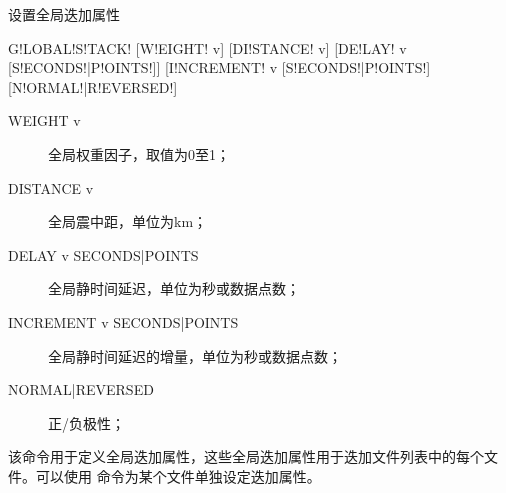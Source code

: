 \label{sss:globalstack}

设置全局迭加属性

\begin{SACSTX}
G!LOBAL!S!TACK! [W!EIGHT! v] [DI!STANCE! v] [DE!LAY! v [S!ECONDS!|P!OINTS!]]
    [I!NCREMENT! v [S!ECONDS!|P!OINTS!] [N!ORMAL!|R!EVERSED!]
\end{SACSTX}

\begin{description}
\item [WEIGHT v] 全局权重因子，取值为0至1；
\item [DISTANCE v] 全局震中距，单位为km；
\item [DELAY v SECONDS|POINTS] 全局静时间延迟，单位为秒或数据点数；
\item [INCREMENT v SECONDS|POINTS] 全局静时间延迟的增量，单位为秒或数据点数；
\item [NORMAL|REVERSED] 正/负极性；
\end{description}

该命令用于定义全局迭加属性，这些全局迭加属性用于迭加文件列表中的每个文件。可以使用
命令为某个文件单独设定迭加属性。




